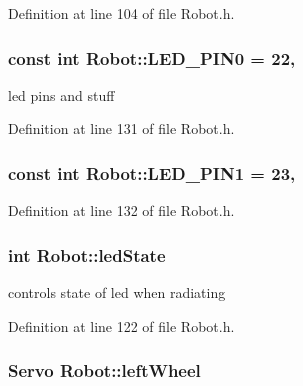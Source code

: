 Definition at line 104 of file Robot.\-h.

\hypertarget{classRobot_a431ea8916b52ddfddbe6d80a09fe71e0}{
\subsubsection[{L\-E\-D\-\_\-\-P\-I\-N0}]{\setlength{\rightskip}{0pt plus 5cm}const int Robot\-::\-L\-E\-D\-\_\-\-P\-I\-N0 = 22\hspace{0.3cm}{\ttfamily [static]}, {\ttfamily [private]}}}\label{classRobot_a431ea8916b52ddfddbe6d80a09fe71e0}
led pins and stuff 

Definition at line 131 of file Robot.\-h.

\hypertarget{classRobot_a4c6f4e38b77bf470d757ebea1b8c3cf0}{
\subsubsection[{L\-E\-D\-\_\-\-P\-I\-N1}]{\setlength{\rightskip}{0pt plus 5cm}const int Robot\-::\-L\-E\-D\-\_\-\-P\-I\-N1 = 23\hspace{0.3cm}{\ttfamily [static]}, {\ttfamily [private]}}}\label{classRobot_a4c6f4e38b77bf470d757ebea1b8c3cf0}


Definition at line 132 of file Robot.\-h.

\hypertarget{classRobot_a3c7308c71db125a8840f9c82b5fec9ca}{
\subsubsection[{led\-State}]{\setlength{\rightskip}{0pt plus 5cm}int Robot\-::led\-State\hspace{0.3cm}{\ttfamily [private]}}}\label{classRobot_a3c7308c71db125a8840f9c82b5fec9ca}


controls state of led when radiating 



Definition at line 122 of file Robot.\-h.

\hypertarget{classRobot_af357e059c6c07190c92c6c9a00e2b8af}{
\subsubsection[{left\-Wheel}]{\setlength{\rightskip}{0pt plus 5cm}Servo Robot\-::left\-Wheel\hspace{0.3cm}{\ttfamily [private]}}}\label{classRobot_af357e059c6c07190c92c6c9a00e2b8af}


